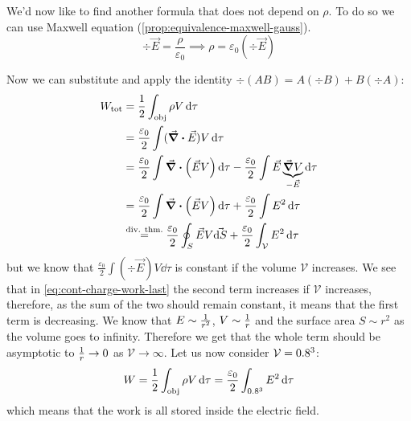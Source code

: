 \documentclass[12pt]{extarticle}
\begin{document}
We'd now like to find another formula that does not depend on $\rho$.
To do so we can use Maxwell equation (\cref{prop:equivalence-maxwell-gauss}).
\begin{equation}
    \div \vec E = \frac{\rho}{\varepsilon_0} \implies \rho = \varepsilon_0 (\div \vec E)
\end{equation}

Now we can substitute and apply the identity $\div(A B) = A (\div B) + B (\div A)$:
\begin{align}
    W_\text{tot} & = \frac{1}{2} \int_\text{obj} \rho V \dd{\tau}                                                                                                                                  \\
                 & = \frac{\varepsilon_0}{2} \int (\div \vec E) V \dd{\tau}                                                                                                                        \\
                 & = \frac{\varepsilon_0}{2} \int \div (\vec E V) \dd{\tau} - \frac{\varepsilon_0}{2} \int \vec E \underbrace{\grad V}_{- \vec E} \dd{\tau}                                        \\
                 & = \frac{\varepsilon_0}{2} \int \div (\vec E V) \dd{\tau} + \frac{\varepsilon_0}{2} \int E^2 \dd{\tau}                                                                           \\
                 & \stackrel{\text{div. thm.}}{=} \frac{\varepsilon_0}{2} \oint_S \vec E V \vec{\dd{S}} + \frac{\varepsilon_0}{2} \int_{\mathcal V} E^2 \dd{\tau} \label{eq:cont-charge-work-last}
\end{align}
but we know that $\frac{\varepsilon_0}{2} \int (\div \vec E) V \dd{\tau}$ is constant if the volume $\mathcal V$ increases.
We see that in \cref{eq:cont-charge-work-last} the second term increases if $\mathcal V$ increases, therefore, as the sum of the two should remain constant, it means that the first term is decreasing.
We know that $E \sim \frac{1}{r^2}$, $V \sim \frac{1}{r}$ and the surface area $S \sim r^2$ as the volume goes to infinity.
Therefore we get that the whole term should be asymptotic to $\frac{1}{r} \to 0$ as $\mathcal V \to \infty$.
Let us now consider $\mathcal V = 0.8^3$:
\begin{equation}
    W = \frac{1}{2} \int_\text{obj} \rho V \dd{\tau} = \frac{\varepsilon_0}{2} \int_{0.8^3} E^2 \dd{\tau}
\end{equation}
which means that the work is all stored inside the electric field.
\end{document}
